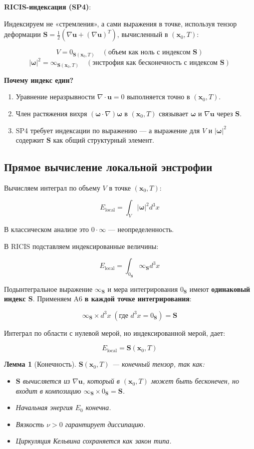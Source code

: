 \documentclass[12pt]{article}
\newtheorem{lemma}{Лемма}
\newcommand{\0}{\mathbf{0}}
\newcommand{\1}{\mathds{1}}
\newcommand{\bu}{\mathbf{u}}
\newcommand{\bomega}{\bm{\omega}}
\newcommand{\bx}{\mathbf{x}}
\newcommand{\bS}{\mathbf{S}}
\begin{document}
\textbf{RICIS-индексация (SP4)}:

Индексируем не «стремления», а сами выражения в точке, используя тензор деформации $\bS = \frac{1}{2}(\nabla\bu + (\nabla\bu)^T)$, вычисленный в $(\bx_0,T)$:

\[
V = 0_{\bS(\bx_0,T)} \quad (\text{объем как ноль с индексом }\bS)
\]
\[
|\bomega|^2 = \infty_{\bS(\bx_0,T)} \quad (\text{энстрофия как бесконечность с индексом }\bS)
\]

\textbf{Почему индекс един?}
\begin{enumerate}
    \item Уравнение неразрывности $\nabla\cdot\bu=0$ выполняется точно в $(\bx_0,T)$.
    \item Член растяжения вихря $(\bomega\cdot\nabla)\bomega$ в $(\bx_0,T)$ связывает $\bomega$ и $\nabla\bu$ через $\bS$.
    \item SP4 требует индексации по выражению --- а выражение для $V$ и $|\bomega|^2$ содержит $\bS$ как общий структурный элемент.
\end{enumerate}

\subsection{Прямое вычисление локальной энстрофии}

Вычисляем интеграл по объему $V$ в точке $(\bx_0,T)$:

\[
E_{\text{local}} = \int_V |\bomega|^2 d^3x
\]

В классическом анализе это $0\cdot\infty$ --- неопределенность.

В RICIS подставляем индексированные величины:

\[
E_{\text{local}} = \int_{0_{\bS}} \infty_{\bS} d^3x
\]

Подынтегральное выражение $\infty_{\bS}$ и мера интегрирования $0_{\bS}$ имеют \textbf{одинаковый индекс $\bS$}. Применяем A6 \textbf{в каждой точке интегрирования}:

\[
\infty_{\bS} \times d^3x \;(\text{где } d^3x = 0_{\bS}) = \bS
\]

Интеграл по области с нулевой мерой, но индексированной мерой, дает:

\[
E_{\text{local}} = \bS(\bx_0,T)
\]

\begin{lemma}[Конечность]
$\bS(\bx_0,T)$ --- конечный тензор, так как:
\begin{itemize}
    \item $\bS$ вычисляется из $\nabla\bu$, который в $(\bx_0,T)$ может быть бесконечен, но входит в композицию $\infty_{\bS} \times 0_{\bS} = \bS$.
    \item Начальная энергия $E_0$ конечна.
    \item Вязкость $\nu > 0$ гарантирует диссипацию.
    \item Циркуляция Кельвина сохраняется как закон типа.
\end{itemize}
\end{lemma}
\end{document}
